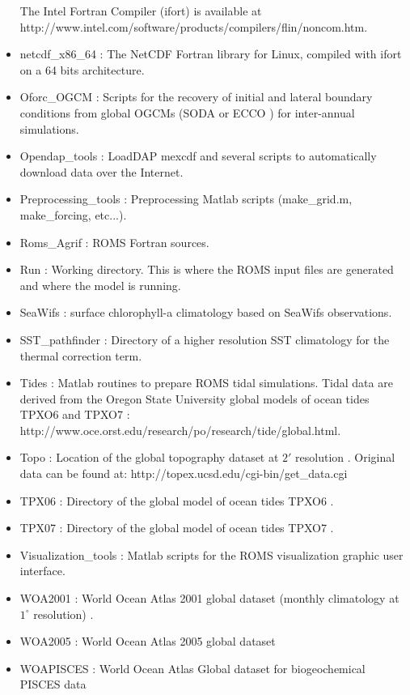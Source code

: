\begin{itemize}
      The Intel Fortran Compiler (ifort) is available at \\
      http://www.intel.com/software/products/compilers/flin/noncom.htm.
\item netcdf\_x86\_64 : The NetCDF Fortran library for Linux, compiled with ifort
      on a 64 bits architecture.
\item Oforc\_OGCM : Scripts for the recovery of initial and lateral boundary 
      conditions from global OGCMs (SODA \citep{Car05} or ECCO \citep{Sta99}) for 
      inter-annual simulations.
\item Opendap\_tools : LoadDAP mexcdf and several scripts to automatically
      download data over the Internet.
\item Preprocessing\_tools : Preprocessing Matlab scripts (make\_grid.m, 
      make\_forcing, etc...).
\item Roms\_Agrif : ROMS Fortran sources.
\item Run : Working directory. This is where the ROMS input files
      are generated and where the model is running.
\item SeaWifs : surface chlorophyll-a climatology based on SeaWifs observations.
\item SST\_pathfinder : Directory of a higher resolution SST climatology 
      \citep{Rey94} for the thermal correction term.
\item Tides : Matlab routines to prepare ROMS tidal simulations. Tidal data
      are derived from the Oregon State University global models of ocean tides 
      TPXO6 and TPXO7 \citep{Egb02}: 
      http://www.oce.orst.edu/research/po/research/tide/global.html.
\item Topo : Location of the global topography dataset at $2'$ resolution
      \citep{Smi97}. Original data can be found at:
      http://topex.ucsd.edu/cgi-bin/get\_data.cgi
\item TPX06 : Directory of the global model of ocean tides TPXO6 \citep{Egb02}.
\item TPX07 : Directory of the global model of ocean tides TPXO7 \citep{Egb02}.
\item Visualization\_tools : Matlab scripts for the ROMS visualization
      graphic user interface.
\item WOA2001 : World Ocean Atlas 2001 global dataset 
      (monthly climatology at $1^\circ$ resolution) \citep{Con02}.
\item WOA2005 : World Ocean Atlas 2005 global dataset 
\item WOAPISCES : World Ocean Atlas Global dataset for biogeochemical PISCES data

\end{itemize}



